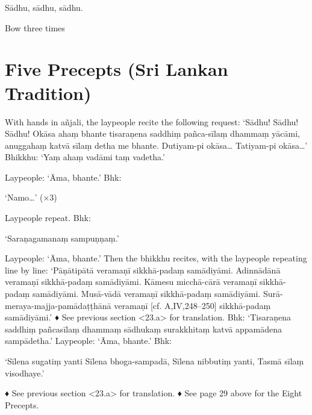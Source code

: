 Sādhu, sādhu, sādhu.

\begin{instruction}
  Bow three times
\end{instruction}

\chapter{Five Precepts (Sri Lankan Tradition)}

With hands in añjali, the laypeople recite the
following request:
‘Sādhu! Sādhu! Sādhu!
Okāsa ahaṃ bhante tisaraṇena saddhiṃ
pañca-sīlaṃ dhammaṃ yācāmi, anuggahaṃ
katvā sīlaṃ detha me bhante.
Dutiyam-pi okāsa…
Tatiyam-pi okāsa…’
Bhikkhu: ‘Yaṃ ahaṃ vadāmi taṃ vadetha.’

Laypeople: ‘Āma, bhante.’
Bhk:

‘Namo…’ (×3)

Laypeople repeat.
Bhk:

‘Saraṇagamanaṃ sampuṇṇaṃ.’

Laypeople: ‘Āma, bhante.’
Then the bhikkhu recites, with the laypeople
repeating line by line:
‘Pāṇātipātā veramaṇī sikkhā-padaṃ samādiyāmi.
Adinnādānā veramaṇī sikkhā-padaṃ samādiyāmi.
Kāmesu micchā-cārā veramaṇī sikkhā-padaṃ
samādiyāmi.
Musā-vādā veramaṇī sikkhā-padaṃ samādiyāmi.
Surā-meraya-majja-pamādaṭṭhānā veramaṇī
[cf. A,IV,248–250]
sikkhā-padaṃ samādiyāmi.’
♦ See previous section <23.a> for translation.
Bhk: ‘Tisaraṇena saddhiṃ pañcasīlaṃ
dhammaṃ sādhukaṃ surakkhitaṃ katvā
appamādena sampādetha.’
Laypeople: ‘Āma, bhante.’
Bhk:

‘Sīlena sugatiṃ yanti
Sīlena bhoga-sampadā,
Sīlena nibbutiṃ yanti,
Tasmā sīlaṃ visodhaye.’

♦ See previous section <23.a> for translation.
♦ See page 29 above for the Eight Precepts.

